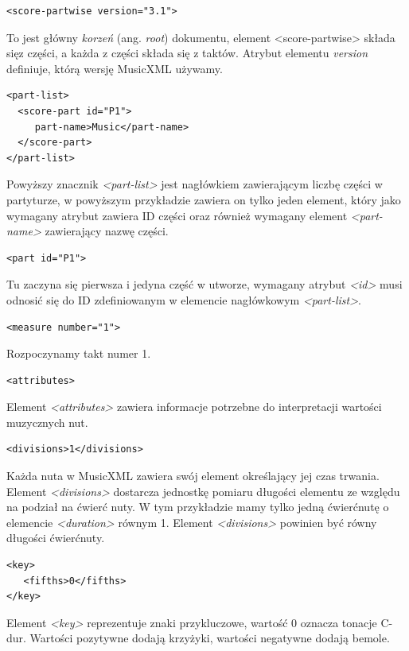 \documentclass[printmode, eng]{mgr}
\begin{document}
\begin{lstlisting}
<score-partwise version="3.1">
\end{lstlisting}
To jest główny \textit{korzeń} (ang. \textit{root}) dokumentu, element <score-partwise> składa się\linebreak z części, a każda z części składa się z taktów. Atrybut elementu \textit{version} definiuje, którą wersję MusicXML używamy.

\begin{lstlisting}
<part-list>
  <score-part id="P1">
     part-name>Music</part-name>
  </score-part>
</part-list>
\end{lstlisting}
Powyższy znacznik \textit{<part-list>} jest nagłówkiem zawierającym liczbę części w partyturze, w powyższym przykładzie zawiera on tylko jeden element, który jako wymagany atrybut zawiera ID części oraz również wymagany element \textit{<part-name>} zawierający nazwę części.


\begin{lstlisting}
<part id="P1">
\end{lstlisting}
Tu zaczyna się pierwsza i jedyna część w utworze, wymagany atrybut \textit{<id>} musi odnosić się do ID zdefiniowanym w elemencie nagłówkowym \textit{<part-list>}.

\begin{lstlisting}
<measure number="1">
\end{lstlisting}
Rozpoczynamy takt numer 1.

\begin{lstlisting}
<attributes>
\end{lstlisting}
Element \textit{<attributes>} zawiera informacje potrzebne do interpretacji wartości muzycznych nut.


\begin{lstlisting}
<divisions>1</divisions>
\end{lstlisting}
Każda nuta w MusicXML zawiera swój element określający jej czas trwania. Element \textit{<divisions>} dostarcza jednostkę pomiaru długości elementu  ze względu na podział na ćwierć nuty. W tym przykładzie mamy tylko jedną ćwierćnutę o elemencie \textit{<duration>} równym 1. Element \textit{<divisions>} powinien być równy długości ćwierćnuty.

\begin{lstlisting}
<key>
   <fifths>0</fifths>
</key>
\end{lstlisting}
Element \textit{<key>} reprezentuje znaki przykluczowe, wartość 0 oznacza tonacje C-dur. Wartości pozytywne dodają krzyżyki, wartości negatywne dodają bemole. 
\end{document}

